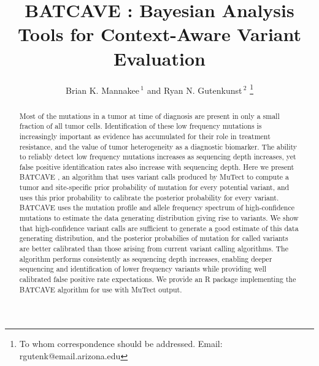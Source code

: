 \documentclass[a4,center,fleqn]{NAR}
\newcommand{\batcave}{BATCAVE }
\begin{document}
\title{\batcave: Bayesian Analysis Tools for Context-Aware Variant Evaluation}

\author{%
Brian K. Mannakee\,$^{1}$ and
Ryan N. Gutenkunst\,$^{2}$%
\footnote{To whom correspondence should be addressed.
Email: rgutenk@email.arizona.edu}}

\address{%
$^{1}$Mel and Enid Zuckerman College of Public Health, University of Arizona, Tucson AZ
and
$^{2}$Department of Molecular and Cellular Biology, University of Arizona, Tucson AZ}


\maketitle

\begin{abstract}
Most of the mutations in a tumor at time of diagnosis are present in only a small fraction of all tumor cells.
Identification of these low frequency mutations is increasingly important as evidence has accumulated for their role in treatment resistance, and the value of tumor heterogeneity as a diagnostic biomarker.
The ability to reliably detect low frequency mutations increases as sequencing depth increases, yet false positive identification rates also increase with sequencing depth.
Here we present \batcave, an algorithm that uses variant calls produced by MuTect to compute a tumor and site-specific prior probability of mutation for every potential variant, and uses this prior probability to calibrate the posterior probability for every variant.
\batcave uses the mutation profile and allele frequency spectrum of high-confidence mutations to estimate the data generating distribution giving rise to variants.
We show that high-confidence variant calls are sufficient to generate a good estimate of this data generating distribution, and the posterior probabilies of mutation for called variants are better calibrated than those arising from current variant calling algorithms.
The algorithm performs consistently as sequencing depth increases, enabling deeper sequencing and identification of lower frequency variants while providing well calibrated false positive rate expectations.
We provide an R package implementing the \batcave algorithm for use with MuTect output.
\end{abstract}
\end{document}
